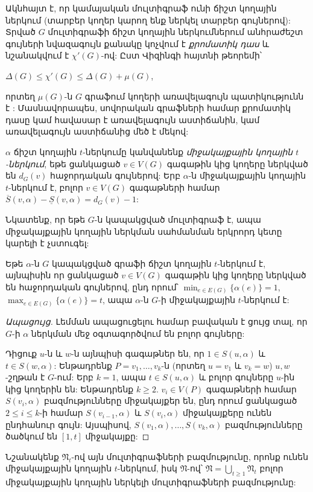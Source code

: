 Ակնհայտ է, որ կամայական մուլտիգրաֆ ունի ճիշտ կողային ներկում (տարբեր կողեր կարող ենք ներկել տարբեր գույներով): Տրված $G$ մուլտիգրաֆի ճիշտ կողային ներկումներում անհրաժեշտ գույների նվազագույն քանակը կոչվում է \textit{քրոմատիկ դաս} և նշանակվում է $\chi'(G)$-ով: Ըստ Վիզինգի հայտնի թեորեմի՝
\begin{center}
$\Delta(G) \leq \chi'(G) \leq \Delta(G) + \mu(G)$,
\end{center}
որտեղ $\mu(G)$-ն $G$ գրաֆում կողերի առավելագույն պատիկությունն է \cite{Vizing1965}: Մասնավորապես, սովորական գրաֆների համար քրոմատիկ դասը կամ հավասար է առավելագույն աստիճանին, կամ առավելագույն աստիճանից մեծ է մեկով:

$\alpha$ ճիշտ կողային $t$-ներկումը կանվանենք \textit{միջակայքային կողային $t$-ներկում}, եթե ցանկացած $v \in V(G)$ գագաթին կից կողերը ներկված են $d_G(v)$ հաջորդական գույներով: Երբ $\alpha$-ն միջակայքային կողային $t$-ներկում է, բոլոր $v \in V(G)$ գագաթների համար $\overline{S}(v,\alpha)-\underline{S}(v,\alpha)=d_G(v)-1$:

Նկատենք, որ եթե $G$-ն կապակցված մուլտիգրաֆ է, ապա միջակայքային կողային ներկման սահմանման երկրորդ կետը կարելի է չստուգել:
\begin{lemma}
\label{t1_lemma} Եթե $\alpha$-ն $G$ կապակցված գրաֆի ճիշտ կողային $t$-ներկում է, այնպիսին որ ցանկացած $v\in V(G)$ գագաթին կից կողերը ներկված են հաջորդական գույներով, ընդ որում՝ $\min_{e\in E(G)}\{\alpha(e)\}=1$, $\max_{e\in
E(G)}\{\alpha(e)\}=t$, ապա $\alpha$-ն $G$-ի միջակայքային $t$-ներկում է:
\end{lemma}
\begin{proof}[Ապացույց] Լեմման ապացուցելու համար բավական է ցույց տալ, որ $G$-ի $\alpha$ ներկման մեջ օգտագործվում են բոլոր գույները:

Դիցուք $u$-ն և $w$-ն այնպիսի գագաթներ են, որ $1\in S(u,\alpha)$ և $t\in S(w,\alpha)$: Ենթադրենք $P=v_{1},\ldots,v_{k}$-ն (որտեղ $u=v_{1}$ և $v_{k}=w$) $u,w$-շղթան է $G$-ում: Երբ $k=1$, ապա $t\in S(u,\alpha)$ և բոլոր գույները $u$-ին կից կողերին են: Ենթադրենք $k\geq 2$. $v_{i}\in V(P)$ գագաթների համար $S(v_{i},\alpha)$ բազմությունները միջակայքեր են, ընդ որում ցանկացած $2\leq i\leq k$-ի համար $S(v_{i-1},\alpha)$ և $S(v_{i},\alpha)$ միջակայքերը ունեն ընդհանուր գույն: Այսպիսով, $S(v_{1},\alpha),\ldots,S(v_{k},\alpha)$ բազմությունները ծածկում են $[1,t]$ միջակայքը:
\end{proof}

Նշանակենք $\mathfrak{N}_t$-ով այն մուլտիգրաֆների բազմությունը, որոնք ունեն միջակայքային կողային $t$-ներկում, իսկ $\mathfrak{N}$-ով՝ $\mathfrak{N}=\bigcup\limits_{t\geq1}{\mathfrak{N}_t}$ բոլոր միջակայքային կողային ներկելի մուլտիգրաֆների բազմությունը:

